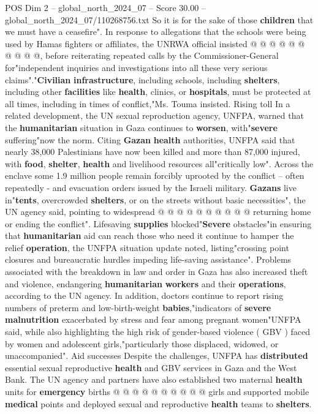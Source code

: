 \begin{textsample}{POS Dim 2 – global\_north\_2024\_07 – Score 30.00 – global\_north\_2024\_07/110268756.txt}
So it is for the sake of those \textbf{children} that we must have a ceasefire".
In response to allegations that the schools were being used by Hamas fighters or affiliates, the UNRWA official insisted @ @ @ @ @ @ @ @ @ @, before reiterating repeated calls by the Commissioner-General for"independent inquiries and investigations into all these very serious claims"."\textbf{Civilian} \textbf{infrastructure}, including schools, including \textbf{shelters}, including other \textbf{facilities} like \textbf{health}, clinics, or \textbf{hospitals}, must be protected at all times, including in times of conflict,"Ms.
Touma insisted.
Rising toll In a related development, the UN sexual reproduction agency, UNFPA, warned that the \textbf{humanitarian} situation in Gaza continues to \textbf{worsen}, with"\textbf{severe} suffering"now the norm.
Citing \textbf{Gazan} \textbf{health} authorities, UNFPA said that nearly 38,000 Palestinians have now been killed and more than 87,000 injured, with \textbf{food}, \textbf{shelter}, \textbf{health} and livelihood resources all"critically low".
Across the enclave some 1.9 million people remain forcibly uprooted by the conflict -- often repeatedly - and evacuation orders issued by the Israeli military. \textbf{Gazans} live in"\textbf{tents}, overcrowded \textbf{shelters}, or on the streets without basic necessities", the UN agency said, pointing to widespread @ @ @ @ @ @ @ @ @ @ returning home or ending the conflict".
Lifesaving \textbf{supplies} blocked"\textbf{Severe} obstacles"in ensuring that \textbf{humanitarian} aid can reach those who need it continue to hamper the relief \textbf{operation}, the UNFPA situation update noted, listing"crossing point closures and bureaucratic hurdles impeding life-saving assistance".
Problems associated with the breakdown in law and order in Gaza has also increased theft and violence, endangering \textbf{humanitarian} \textbf{workers} and their \textbf{operations}, according to the UN agency.
In addition, doctors continue to report rising numbers of preterm and low-birth-weight \textbf{babies},"indicators of \textbf{severe} \textbf{malnutrition} exacerbated by stress and fear among pregnant women"UNFPA said, while also highlighting the high risk of gender-based violence ( GBV ) faced by women and adolescent girls,"particularly those displaced, widowed, or unaccompanied".
Aid successes Despite the challenges, UNFPA has \textbf{distributed} essential sexual reproductive \textbf{health} and GBV services in Gaza and the West Bank.
The UN agency and partners have also established two maternal \textbf{health} units for \textbf{emergency} births @ @ @ @ @ @ @ @ @ @ girls and supported mobile \textbf{medical} points and deployed sexual and reproductive \textbf{health} teams to \textbf{shelters}.

\end{textsample}
